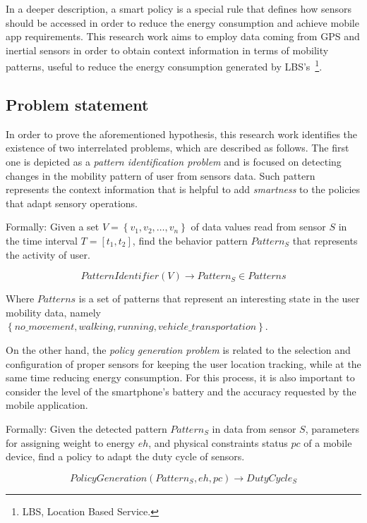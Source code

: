 \documentclass[12pt]{article}
\numberwithin{equation}{section}
\numberwithin{table}{section}
\numberwithin{figure}{section}
\begin{document}
In a deeper description, a smart policy is a special rule that defines how sensors should be accessed in order to reduce the energy consumption and achieve mobile app requirements.
This research work aims to employ data coming from GPS and inertial sensors in order to obtain context information in terms of mobility patterns, useful to reduce the energy consumption generated by LBS's~\footnote{LBS, Location Based Service.}.


\subsection{Problem statement} 
\label{sub:problem_statement}
In order to prove the aforementioned hypothesis, this research work identifies the existence of two interrelated problems, which are described as follows.
The first one is depicted as a \emph{pattern identification problem} and is focused on detecting changes in the mobility pattern of user from sensors data.
Such pattern represents the context information that is helpful to add \emph{smartness} to the policies that adapt sensory operations.

Formally:
\label{ssub:pattern_identification}
Given a set $V = \left\{v_{1}, v_{2}, \dotsc, v_{n}\right\}$ of data values read from sensor $S$ in the time interval $T = [t_{1}, t_{2}]$, find the behavior pattern $Pattern_{S}$ that represents the activity of user.

\begin{equation}
  PatternIdentifier( V ) \longrightarrow{} Pattern_{S} \in Patterns
\end{equation}

Where $Patterns$ is a set of patterns that represent an interesting state in the user mobility data, namely $\left\{no\_movement, walking, running, vehicle\_transportation\right\}$.

On the other hand, the \emph{policy generation problem} is related to the selection and configuration of proper sensors for keeping the user location tracking, while at the same time reducing energy consumption.
For this process, it is also important to consider the level of the smartphone's battery and the accuracy requested by the mobile application.

Formally:
Given the detected pattern $Pattern_{S}$ in data from sensor $S$, parameters for assigning weight to energy $eh$, and physical constraints status $pc$ of a mobile device, find a policy to adapt the duty cycle of sensors.

\begin{equation}
  PolicyGeneration( Pattern_{S}, eh, pc ) \longrightarrow{} DutyCycle_{S}
\end{equation}
\end{document}
